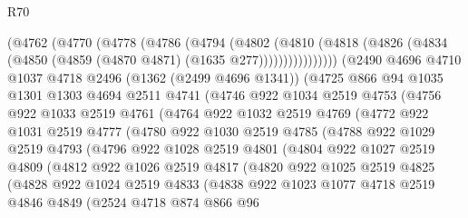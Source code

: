\begin{lexlean}{R70}
\begin{coremodule}
            (@4762
              (@4770
                (@4778
                  (@4786
                    (@4794
                      (@4802
                        (@4810
                          (@4818
                            (@4826 (@4834 (@4850 (@4859 (@4870 @4871) (@1635 @277))))))))))))))))
      (@2490
        @4696
        @4710
        @1037
        @4718
        @2496
        (@1362 (@2499 @4696 @1341))
        (@4725
          @866
          @94
          @1035
          @1301
          @1303
          @4694
          @2511
          @4741
          (@4746
            @922
            @1034
            @2519
            @4753
            (@4756
              @922
              @1033
              @2519
              @4761
              (@4764
                @922
                @1032
                @2519
                @4769
                (@4772
                  @922
                  @1031
                  @2519
                  @4777
                  (@4780
                    @922
                    @1030
                    @2519
                    @4785
                    (@4788
                      @922
                      @1029
                      @2519
                      @4793
                      (@4796
                        @922
                        @1028
                        @2519
                        @4801
                        (@4804
                          @922
                          @1027
                          @2519
                          @4809
                          (@4812
                            @922
                            @1026
                            @2519
                            @4817
                            (@4820
                              @922
                              @1025
                              @2519
                              @4825
                              (@4828
                                @922
                                @1024
                                @2519
                                @4833
                                (@4838
                                  @922
                                  @1023
                                  @1077
                                  @4718
                                  @2519
                                  @4846
                                  @4849
                                  (@2524
                                    @4718
                                    @874
                                    @866
                                    @96

\end{coremodule}
\end{lexlean}

